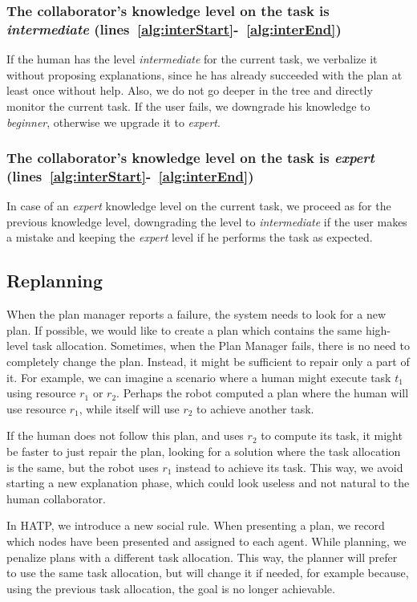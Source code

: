 \subsubsection{The collaborator's knowledge level on the task is \textit{intermediate} (lines~\ref{alg:interStart}-~\ref{alg:interEnd})}
 If the human has the level \textit{intermediate} for the current task, we verbalize it without proposing explanations, since he has already  succeeded with the plan at least once without help. Also, we do not go deeper in the tree and directly monitor the current task. If the user  fails, we downgrade his knowledge to \textit{beginner}, otherwise we upgrade it to \textit{expert}.

\subsubsection{The collaborator's knowledge level on the task is \textit{expert} (lines~\ref{alg:interStart}-~\ref{alg:interEnd})}
 In case of an \textit{expert} knowledge level on the current task, we  proceed as for the previous knowledge level, downgrading the level to \textit{intermediate} if the user makes a mistake and keeping the \textit{expert} level if he performs the task as expected.



\subsection{Replanning}
When the plan manager reports a failure, the system needs to look for a new plan. If possible, we would like to create a plan which contains the same high-level task allocation. Sometimes, when the Plan Manager fails, there is no need to completely change the plan. Instead, it might be sufficient to repair only a part of it. For example, we can imagine a scenario where a human might execute task $t_1$ using resource $r_1$ or $r_2$. Perhaps the robot computed a plan where the human will use resource $r_1$, while itself will use $r_2$ to achieve another task.

If the human does not follow this plan, and uses $r_2$ to compute its task,  it might be faster to just repair the plan, looking for a solution where the task allocation is the same, but the robot uses $r_1$ instead to achieve its task. This way, we avoid starting a new explanation phase, which could look useless and not natural to the human collaborator.


In HATP, we introduce a new social rule. When presenting a plan, we record which nodes have been presented and assigned to each agent. While planning, we penalize plans with a different task allocation. This way, the planner will prefer to use the same task allocation, but will change it if needed, for example because, using the previous task allocation, the goal is no longer achievable.



